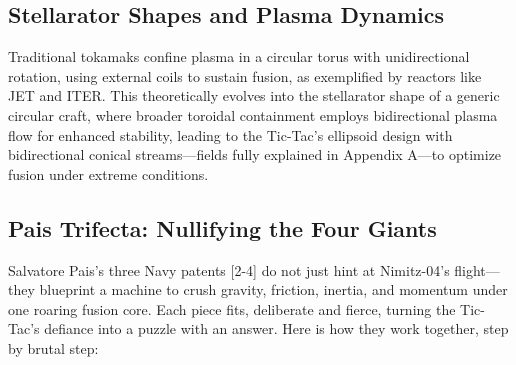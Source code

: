 \documentclass[11pt]{article}
\begin{document}
	\subsection{Stellarator Shapes and Plasma Dynamics}
	Traditional tokamaks confine plasma in a circular torus with unidirectional rotation, using external coils to sustain fusion, as exemplified by reactors like JET and ITER. This theoretically evolves into the stellarator shape of a generic circular craft, where broader toroidal containment employs bidirectional plasma flow for enhanced stability, leading to the Tic-Tac’s ellipsoid design with bidirectional conical streams—fields fully explained in Appendix A—to optimize fusion under extreme conditions.
	
	\subsection{Pais Trifecta: Nullifying the Four Giants}
	Salvatore Pais’s three Navy patents [2-4] do not just hint at Nimitz-04’s flight—they blueprint a machine to crush gravity, friction, inertia, and momentum under one roaring fusion core. Each piece fits, deliberate and fierce, turning the Tic-Tac’s defiance into a puzzle with an answer. Here is how they work together, step by brutal step:
	
\end{document}

